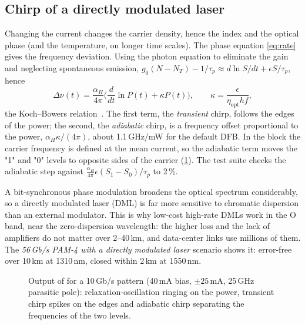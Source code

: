 \subsection{Chirp of a directly modulated laser}\label{sec:chirp}
Changing the current changes the carrier density, hence the index and the optical phase (and
the temperature, on longer time scales). The phase equation \cref{eq:rate} gives the frequency
deviation. Using the photon equation to eliminate the gain and neglecting spontaneous emission,
$g_0(N-N_T)-1/\tau_p\approx d\ln S/dt+\epsilon S/\tau_p$, hence
\begin{equation}
  \Delta\nu(t)=\frac{\alpha_H}{4\pi}\Big(\frac{d}{dt}\ln P(t)+\kappa P(t)\Big),\qquad
  \kappa=\frac{\epsilon}{\eta_{\mathrm{opt}}hf},
\end{equation}
the Koch--Bowers relation~\cite{koch1984}. The first term, the \emph{transient} chirp, follows the
edges of the power; the second, the \emph{adiabatic} chirp, is a frequency offset proportional to
the power, $\alpha_H\kappa/(4\pi)$, about 1.1\,GHz/mW for the default DFB. In the block the carrier
frequency is defined at the mean current, so the adiabatic term moves the "1" and "0" levels to
opposite sides of the carrier (\cref{fig:dml-chirp}). The test suite checks the adiabatic step
against $\frac{\alpha_H}{4\pi}\epsilon(S_1-S_0)/\tau_p$ to 2\,\%.

A bit-synchronous phase modulation broadens the optical spectrum considerably, so a directly
modulated laser (DML) is far more sensitive to chromatic dispersion than an external modulator.
This is why low-cost high-rate DMLs work in the O band, near the zero-dispersion wavelength: the
higher loss and the lack of amplifiers do not matter over 2--40\,km, and data-center links use
millions of them. The \emph{56\,Gb/s PAM-4 with a directly modulated laser} scenario shows it:
error-free over 10\,km at 1310\,nm, closed within 2\,km at 1550\,nm.

\begin{figure}[htbp]
\centering
{}
\caption{Output of  for a 10\,Gb/s pattern (40\,mA bias, $\pm25$\,mA, 25\,GHz parasitic pole):
relaxation-oscillation ringing on the power, transient chirp spikes on the edges and adiabatic
chirp separating the frequencies of the two levels.}
\label{fig:dml-chirp}
\end{figure}

